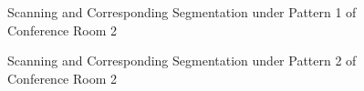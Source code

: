 \documentclass[11pt, a4paper,oneside,chapterprefix=false]{scrbook}
\begin{document}
\begin{figure}[H]
    \centering
      \label{fig:conf2 0 occluded} \hfill
     \label{fig:conf2 0 seg}
    \caption{Scanning and Corresponding Segmentation under Pattern 1 of Conference Room 2}
    \label{fig:conf2 0 occ and seg}
\end{figure}

\begin{figure}[H]
    \centering
      \label{fig:conf2 1 occluded} \hfill
     \label{fig:conf2 1 seg}
    \caption{Scanning and Corresponding Segmentation under Pattern 2 of Conference Room 2}
    \label{fig:conf2 1 occ and seg}
\end{figure}
\end{document}
